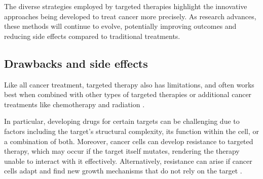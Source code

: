 The diverse strategies employed by targeted therapies highlight the innovative approaches being developed to treat cancer more precisely. As research advances, these methods will continue to evolve, potentially improving outcomes and reducing side effects compared to traditional treatments.

\subsection{Drawbacks and side effects}

Like all cancer treatment, targeted therapy also has limitations, and often works best when combined with other types of targeted therapies or additional cancer treatments like chemotherapy and radiation \cite{target_therapy1}.

In particular, developing drugs for certain targets can be challenging due to factors including the target's structural complexity, its function within the cell, or a combination of both. Moreover, cancer cells can develop resistance to targeted therapy, which may occur if the target itself mutates, rendering the therapy unable to interact with it effectively. Alternatively, resistance can arise if cancer cells adapt and find new growth mechanisms that do not rely on the target \cite{target_therapy1}.


